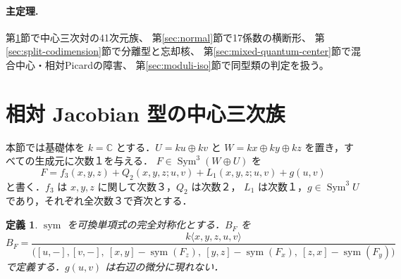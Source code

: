 \documentclass[11pt,a4paper]{ltjsarticle}
\numberwithin{equation}{section}
\newtheorem{definition}[theorem]{定義}
\newcommand{\C}{\mathbb C}
\newcommand{\Sym}{\operatorname{Sym}}
\newcommand{\Symm}{\operatorname{sym}}
\begin{document}
\paragraph{主定理.}
第\ref{sec:construction}節で中心三次対の41次元族、
第\ref{sec:normal}節で17係数の横断形、
第\ref{sec:split-codimension}節で分離型と忘却核、
第\ref{sec:mixed-quantum-center}節で混合中心・相対Picardの障害、
第\ref{sec:moduli-iso}節で同型類の判定を扱う。

\section{相対 Jacobian 型の中心三次族}\label{sec:construction}
本節では基礎体を $k=\C$ とする．$U=ku\oplus kv$ と
$W=kx\oplus ky\oplus kz$ を置き，すべての生成元に次数１を与える．
$F\in\Sym^3(W\oplus U)$ を
\begin{equation}\label{eq:Ffull}
 F=f_3(x,y,z)+Q_2(x,y,z;u,v)+L_1(x,y,z;u,v)+g(u,v)
\end{equation}
と書く．$f_3$ は $x,y,z$ に関して次数３，$Q_2$ は次数２，
$L_1$ は次数１，$g\in\Sym^3U$ であり，それぞれ全次数３で斉次とする．

\begin{definition}\label{def:B}
$\Symm$ を可換単項式の完全対称化とする．$B_F$ を
\begin{equation}\label{eq:B}
 B_F=\frac{k\langle x,y,z,u,v\rangle}{
 \bigl([u,-],[v,-],\ [x,y]-\Symm(F_z),\
 [y,z]-\Symm(F_x),\ [z,x]-\Symm(F_y)\bigr)}
\end{equation}
で定義する．$g(u,v)$ は右辺の微分に現れない．
\end{definition}
\end{document}
